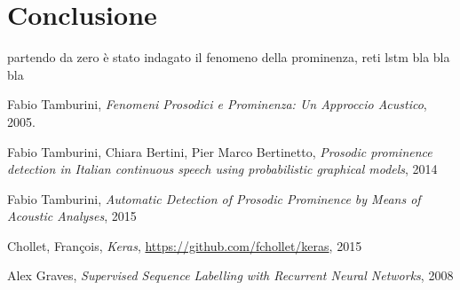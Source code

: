 \documentclass[twoside,twocolumn,10pt]{extarticle}
\theoremstyle{definition}
\begin{document}
\section{Conclusione}
	partendo da zero è stato indagato il fenomeno della prominenza, reti lstm bla bla bla

		
\begin{thebibliography}{99}	
		Fabio Tamburini,
		\newblock \emph{Fenomeni Prosodici e Prominenza: Un Approccio Acustico},
		2005.

		Fabio Tamburini, Chiara Bertini, Pier Marco Bertinetto,
		\newblock \emph{Prosodic prominence detection in Italian continuous speech using probabilistic graphical models},
		2014

		Fabio Tamburini,
		\newblock \emph{Automatic Detection of Prosodic Prominence by Means of Acoustic Analyses},
		2015

		Chollet, Fran\c{c}ois,
		\newblock \emph{Keras},
		\url{https://github.com/fchollet/keras},
		2015

		Alex Graves,
		\newblock \emph{Supervised Sequence Labelling with Recurrent Neural Networks},
		2008
\end{thebibliography}
\end{document}
